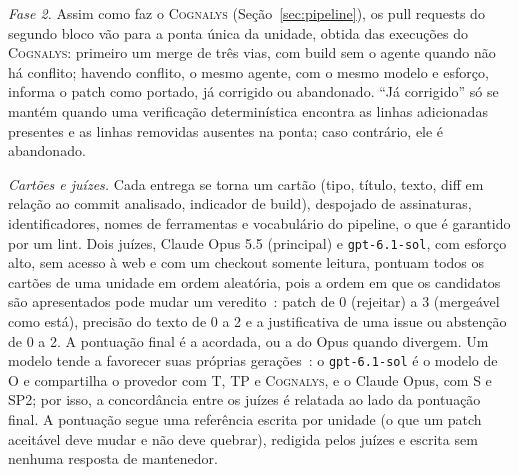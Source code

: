 \documentclass[conference]{IEEEtran}
\newcommand{\system}{\textsc{Cognalys}}
\begin{document}
\emph{Fase 2.} Assim como faz o {\system} (Seção~\ref{sec:pipeline}), os pull requests
do segundo bloco vão para a ponta única da unidade, obtida das execuções do {\system}:
primeiro um merge de três vias, com build sem o agente quando não há conflito; havendo conflito, o
mesmo agente, com o mesmo modelo e esforço, informa o patch como portado, já corrigido ou
abandonado. ``Já corrigido'' só se mantém quando uma verificação determinística encontra as
linhas adicionadas presentes e as linhas removidas ausentes na ponta; caso contrário, ele é
abandonado.

\emph{Cartões e juízes.} Cada entrega se torna um cartão (tipo, título, texto,
diff em relação ao commit analisado, indicador de build), despojado de assinaturas,
identificadores, nomes de ferramentas e vocabulário do pipeline, o que é garantido por um lint. Dois
juízes, Claude Opus 5.5 (principal) e \texttt{gpt-6.1-sol}, com esforço alto,
sem acesso à web e com um checkout somente leitura, pontuam todos os cartões de uma unidade em
ordem aleatória, pois a ordem em que os candidatos são apresentados pode mudar
um veredito~\cite{wang2024fair}: patch de 0 (rejeitar) a 3 (mergeável como
está), precisão do texto de 0 a 2 e a justificativa de uma issue ou abstenção
de 0 a 2. A pontuação final é a acordada, ou a do Opus quando divergem. Um
modelo tende a favorecer suas próprias gerações~\cite{panickssery2024selfpref}:
o \texttt{gpt-6.1-sol} é o modelo de O e compartilha o provedor com T, TP e
{\system}, e o Claude Opus, com S e SP2; por isso, a concordância entre os
juízes é relatada ao lado da pontuação final. A pontuação segue uma
referência escrita por unidade (o que um patch aceitável deve mudar e não deve
quebrar), redigida pelos juízes e escrita sem nenhuma resposta de mantenedor.
\end{document}
